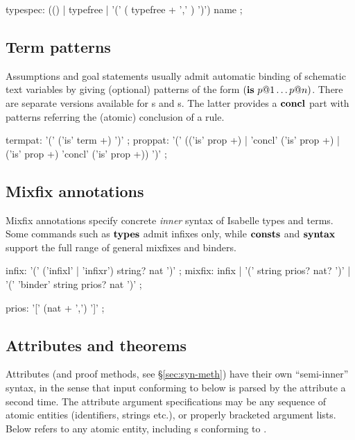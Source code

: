 \begin{rail}
  typespec: (() | typefree | '(' ( typefree + ',' ) ')') name
  ;
\end{rail}


\subsection{Term patterns}\label{sec:term-pats}

Assumptions and goal statements usually admit automatic binding of schematic
text variables by giving (optional) patterns of the form $({\mathord{\mathbf{is}}}~p@1 \dots p@n)$.
There are separate versions available for s and
s.  The latter provides a ${\mathord{\mathbf{concl}}}$ part with patterns
referring the (atomic) conclusion of a rule.

\begin{rail}
  termpat: '(' ('is' term +) ')'
  ;
  proppat: '(' (('is' prop +) | 'concl' ('is' prop +) | ('is' prop +) 'concl' ('is' prop +)) ')'
  ;
\end{rail}


\subsection{Mixfix annotations}

Mixfix annotations specify concrete \emph{inner} syntax of Isabelle types and
terms.  Some commands such as ${\mathord{\mathbf{types}}}$ admit infixes only, while ${\mathord{\mathbf{consts}}}$ and
${\mathord{\mathbf{syntax}}}$ support the full range of general mixfixes and binders.

\begin{rail}
  infix: '(' ('infixl' | 'infixr') string? nat ')'
  ;
  mixfix: infix | '(' string prios? nat? ')' | '(' 'binder' string prios? nat ')'
  ;

  prios: '[' (nat + ',') ']'
  ;
\end{rail}


\subsection{Attributes and theorems}\label{sec:syn-att}

Attributes (and proof methods, see \S\ref{sec:syn-meth}) have their own
``semi-inner'' syntax, in the sense that input conforming to
 below is parsed by the attribute a second time.  The
attribute argument specifications may be any sequence of atomic entities
(identifiers, strings etc.), or properly bracketed argument lists.  Below
 refers to any atomic entity, including s
conforming to .

